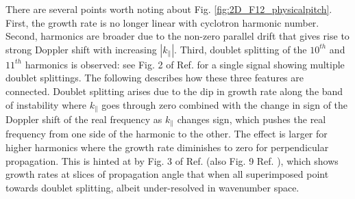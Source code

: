 \documentclass[12pt]{iopart}
\begin{document}
There are several points worth noting about Fig. \ref{fig:2D_F12_physicalpitch}.
First, the
growth rate is no longer linear with cyclotron harmonic number. Second,
harmonics are broader due to the non-zero parallel drift that gives rise to
strong Doppler shift with increasing $|k_\parallel|$. Third, doublet splitting
of the $10^{th}$ and $11^{th}$ harmonics is observed: see Fig. 2 of Ref.
\cite{Cottrell1993} for a single
signal showing multiple doublet splittings.
The following describes how these three features are
connected. Doublet splitting arises due to the dip in growth rate along the 
band of instability where
$k_\parallel$ goes through zero combined with the change in sign of the Doppler
shift of the real frequency as $k_\parallel$ changes sign, which pushes the real
frequency from one side of the harmonic to the other. The effect is
larger for higher harmonics where the growth rate diminishes to zero for
perpendicular propagation.
This is hinted at by  Fig. 3 of Ref. \cite{Dendy1994} (also
Fig. 9 Ref. \cite{Dendy1995}), which shows growth rates at slices of
propagation angle that when all superimposed point towards doublet splitting,
albeit under-resolved in wavenumber space. 
\end{document}
